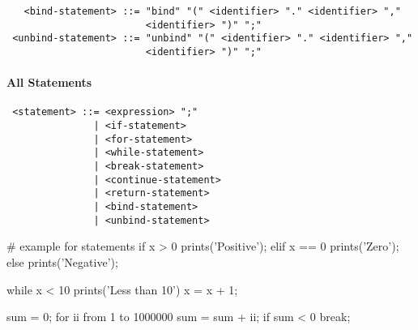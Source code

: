 \begin{verbatim}
   <bind-statement> ::= "bind" "(" <identifier> "." <identifier> ","
                        <identifier> ")" ";"
 <unbind-statement> ::= "unbind" "(" <identifier> "." <identifier> ","
                        <identifier> ")" ";"
\end{verbatim}

\paragraph{All Statements}

\begin{verbatim}
 <statement> ::= <expression> ";"
               | <if-statement>
               | <for-statement>
               | <while-statement>
               | <break-statement>
               | <continue-statement>
               | <return-statement>
               | <bind-statement>
               | <unbind-statement>
\end{verbatim}

\begin{mylisting}
# example for statements
if x > 0
{
  prints('Positive');
}
elif x == 0
{
  prints('Zero');
}
else
{
  prints('Negative');
}

while x < 10
{
  prints('Less than 10')
  x = x + 1;
}

sum = 0;
for ii from 1 to 1000000
{
  sum = sum + ii;
  if sum < 0
  {
    break;
  }
}
\end{mylisting}
